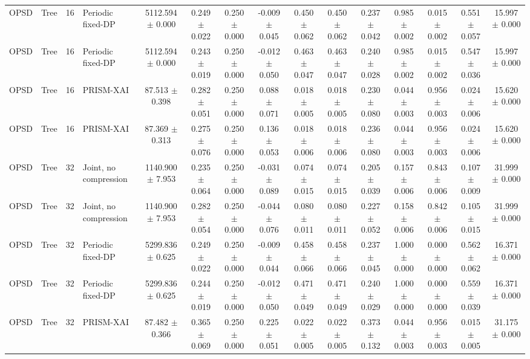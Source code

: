 \begin{tabular}{llllccccccccccc}
OPSD & Tree & 16 & Periodic fixed-DP & 5112.594 $\pm$ 0.000 & 0.249 $\pm$ 0.022 & 0.250 $\pm$ 0.000 & -0.009 $\pm$ 0.045 & 0.450 $\pm$ 0.062 & 0.450 $\pm$ 0.062 & 0.237 $\pm$ 0.042 & 0.985 $\pm$ 0.002 & 0.015 $\pm$ 0.002 & 0.551 $\pm$ 0.057 & 15.997 $\pm$ 0.000 \\
OPSD & Tree & 16 & Periodic fixed-DP & 5112.594 $\pm$ 0.000 & 0.243 $\pm$ 0.019 & 0.250 $\pm$ 0.000 & -0.012 $\pm$ 0.050 & 0.463 $\pm$ 0.047 & 0.463 $\pm$ 0.047 & 0.240 $\pm$ 0.028 & 0.985 $\pm$ 0.002 & 0.015 $\pm$ 0.002 & 0.547 $\pm$ 0.036 & 15.997 $\pm$ 0.000 \\
OPSD & Tree & 16 & PRISM-XAI & 87.513 $\pm$ 0.398 & 0.282 $\pm$ 0.051 & 0.250 $\pm$ 0.000 & 0.088 $\pm$ 0.071 & 0.018 $\pm$ 0.005 & 0.018 $\pm$ 0.005 & 0.230 $\pm$ 0.080 & 0.044 $\pm$ 0.003 & 0.956 $\pm$ 0.003 & 0.024 $\pm$ 0.006 & 15.620 $\pm$ 0.000 \\
OPSD & Tree & 16 & PRISM-XAI & 87.369 $\pm$ 0.313 & 0.275 $\pm$ 0.076 & 0.250 $\pm$ 0.000 & 0.136 $\pm$ 0.053 & 0.018 $\pm$ 0.006 & 0.018 $\pm$ 0.006 & 0.236 $\pm$ 0.080 & 0.044 $\pm$ 0.003 & 0.956 $\pm$ 0.003 & 0.024 $\pm$ 0.006 & 15.620 $\pm$ 0.000 \\
OPSD & Tree & 32 & Joint, no compression & 1140.900 $\pm$ 7.953 & 0.235 $\pm$ 0.064 & 0.250 $\pm$ 0.000 & -0.031 $\pm$ 0.089 & 0.074 $\pm$ 0.015 & 0.074 $\pm$ 0.015 & 0.205 $\pm$ 0.039 & 0.157 $\pm$ 0.006 & 0.843 $\pm$ 0.006 & 0.107 $\pm$ 0.009 & 31.999 $\pm$ 0.000 \\
OPSD & Tree & 32 & Joint, no compression & 1140.900 $\pm$ 7.953 & 0.282 $\pm$ 0.054 & 0.250 $\pm$ 0.000 & -0.044 $\pm$ 0.076 & 0.080 $\pm$ 0.011 & 0.080 $\pm$ 0.011 & 0.227 $\pm$ 0.052 & 0.158 $\pm$ 0.006 & 0.842 $\pm$ 0.006 & 0.105 $\pm$ 0.015 & 31.999 $\pm$ 0.000 \\
OPSD & Tree & 32 & Periodic fixed-DP & 5299.836 $\pm$ 0.625 & 0.249 $\pm$ 0.022 & 0.250 $\pm$ 0.000 & -0.009 $\pm$ 0.044 & 0.458 $\pm$ 0.066 & 0.458 $\pm$ 0.066 & 0.237 $\pm$ 0.045 & 1.000 $\pm$ 0.000 & 0.000 $\pm$ 0.000 & 0.562 $\pm$ 0.062 & 16.371 $\pm$ 0.000 \\
OPSD & Tree & 32 & Periodic fixed-DP & 5299.836 $\pm$ 0.625 & 0.244 $\pm$ 0.019 & 0.250 $\pm$ 0.000 & -0.012 $\pm$ 0.050 & 0.471 $\pm$ 0.049 & 0.471 $\pm$ 0.049 & 0.240 $\pm$ 0.029 & 1.000 $\pm$ 0.000 & 0.000 $\pm$ 0.000 & 0.559 $\pm$ 0.039 & 16.371 $\pm$ 0.000 \\
OPSD & Tree & 32 & PRISM-XAI & 87.482 $\pm$ 0.366 & 0.365 $\pm$ 0.069 & 0.250 $\pm$ 0.000 & 0.225 $\pm$ 0.051 & 0.022 $\pm$ 0.005 & 0.022 $\pm$ 0.005 & 0.373 $\pm$ 0.132 & 0.044 $\pm$ 0.003 & 0.956 $\pm$ 0.003 & 0.015 $\pm$ 0.005 & 31.175 $\pm$ 0.000 \\

\end{tabular}
